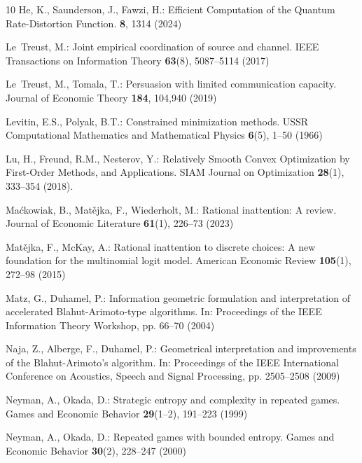\documentclass[smallextended,referee,envcountsect,]{svjour3}
\begin{document}
\begin{thebibliography}{10}
He, K., Saunderson, J., Fawzi, H.: {Efficient {C}omputation of the {Q}uantum
  {R}ate-{D}istortion {F}unction}.
 \textbf{8}, 1314 (2024)

Le~Treust, M.: Joint empirical coordination of source and channel.
\newblock IEEE Transactions on Information Theory \textbf{63}(8), 5087--5114
  (2017)

Le~Treust, M., Tomala, T.: Persuasion with limited communication capacity.
\newblock Journal of Economic Theory \textbf{184}, 104,940 (2019)

Levitin, E.S., Polyak, B.T.: Constrained minimization methods.
\newblock USSR Computational Mathematics and Mathematical Physics
  \textbf{6}(5), 1--50 (1966)

Lu, H., Freund, R.M., Nesterov, Y.: {Relatively Smooth Convex Optimization by
  First-Order Methods, and Applications}.
\newblock SIAM Journal on Optimization \textbf{28}(1), 333--354 (2018).
\newblock {}

Ma\'{c}kowiak, B., Mat\v{e}jka, F., Wiederholt, M.: Rational inattention: A
  review.
\newblock Journal of Economic Literature \textbf{61}(1), 226--73 (2023)

Mat\v{e}jka, F., McKay, A.: Rational inattention to discrete choices: A new
  foundation for the multinomial logit model.
\newblock American Economic Review \textbf{105}(1), 272--98 (2015)

Matz, G., Duhamel, P.: {Information geometric formulation and interpretation of
  accelerated {B}lahut-{A}rimoto-type algorithms}.
\newblock In: Proceedings of the IEEE Information Theory Workshop, pp. 66--70
  (2004)

Naja, Z., Alberge, F., Duhamel, P.: {Geometrical interpretation and
  improvements of the {B}lahut-{A}rimoto's algorithm}.
\newblock In: Proceedings of the IEEE International Conference on Acoustics,
  Speech and Signal Processing, pp. 2505--2508 (2009)

Neyman, A., Okada, D.: Strategic entropy and complexity in repeated games.
\newblock Games and Economic Behavior \textbf{29}(1--2), 191--223 (1999)

Neyman, A., Okada, D.: Repeated games with bounded entropy.
\newblock Games and Economic Behavior \textbf{30}(2), 228--247 (2000)


\end{thebibliography}
\end{document}
